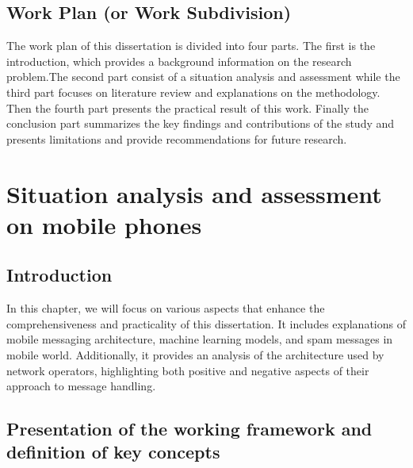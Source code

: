 \documentclass[12pt,a4paper, oneside]{book}
\begin{document}
	\section{Work Plan (or Work Subdivision)}
	The work plan of this dissertation is divided into four parts. The first is the introduction, which provides a background information on the research problem.The second part consist of a situation analysis and assessment while the third part focuses on literature review and explanations on the methodology. Then the fourth part presents the practical result of this work. Finally the conclusion part summarizes the key findings and contributions of the study and presents limitations and provide recommendations for future research. \\
		
	\chapter{Situation analysis and assessment on mobile phones}
	\section{Introduction}
	In this chapter, we will focus on various aspects that enhance the comprehensiveness and practicality of this dissertation. It includes explanations of mobile messaging architecture, machine learning models, and spam messages in mobile world. Additionally, it provides an analysis of the architecture used by network operators, highlighting both positive and negative aspects of their approach to message handling.
	\section{Presentation of the working framework and definition of key concepts}
\end{document}
